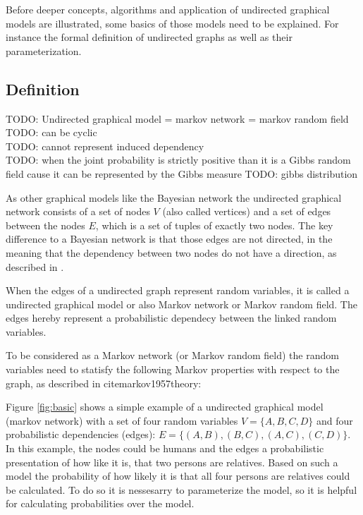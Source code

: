 Before deeper concepts, algorithms and application of undirected graphical models are illustrated, some basics of those models need to be explained. For instance the formal definition of undirected graphs as well as their parameterization.

\subsection{Definition}

TODO: Undirected graphical model = markov network = markov random field 
TODO: can be cyclic \\
TODO: cannot represent induced dependency \\
TODO: when the joint probability is strictly positive than it is a Gibbs random field cause it can be represented by the Gibbs measure
TODO: gibbs distribution

As other graphical models like the Bayesian network the undirected graphical network consists of a set of nodes $V$ (also called vertices) and a set of edges between the nodes $E$, which is a set of tuples of exactly two nodes. The key difference to a Bayesian network is that those edges are not directed, in the meaning that the dependency between two nodes do not have a direction, as described in \cite{koller2009probabilistic}.

When the edges of a undirected graph represent random variables, it is called a undirected graphical model or also Markov network or Markov random field.\cite{kindermann1980markov} The edges hereby represent a probabilistic dependecy between the linked random variables.

To be considered as a Markov network (or Markov random field) the random variables need to statisfy the following Markov properties with respect to the graph, as described in cite{markov1957theory}:


Figure \ref{fig:basic} shows a simple example of a undirected graphical model (markov network) with a set of four random variables $V=\{A,B,C,D\}$ and four probabilistic dependencies (edges): $E=\{(A,B),(B,C),(A,C),(C,D)\}$. In this example, the nodes could be humans and the edges a probabilistic presentation of how like it is, that two persons are relatives. Based on such a model the probability of how likely it is that all four persons are relatives could be calculated. To do so it is nessesarry to parameterize the model, so it is helpful for calculating probabilities over the model.

